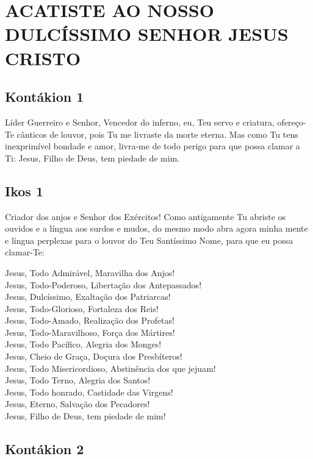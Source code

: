 \documentclass{subfiles}
\begin{document}
\chapter{ACATISTE AO NOSSO DULCÍSSIMO SENHOR JESUS CRISTO}

\section{Kontákion 1}

Líder Guerreiro e Senhor, Vencedor do inferno, eu, Teu servo e
criatura, ofereço-Te cânticos de louvor, pois Tu me livraste da morte eterna.
Mas como Tu tens inexprimível bondade e amor, livra-me de todo perigo para
que possa clamar a Ti: Jesus, Filho de Deus, tem piedade de mim.

\section{Ikos 1}

Criador dos anjos e Senhor dos Exércitos! Como antigamente Tu
abriste os ouvidos e a língua aos surdos e mudos, do mesmo modo abra agora
minha mente e língua perplexas para o louvor do Teu Santíssimo Nome, para
que eu possa clamar-Te:

Jesus, Todo Admirável, Maravilha dos Anjos! \\
Jesus, Todo-Poderoso, Libertação dos Antepassados! \\
Jesus, Dulcíssimo, Exaltação dos Patriarcas! \\
Jesus, Todo-Glorioso, Fortaleza dos Reis! \\
Jesus, Todo-Amado, Realização dos Profetas! \\
Jesus, Todo-Maravilhoso, Força dos Mártires! \\
Jesus, Todo Pacífico, Alegria dos Monges! \\
Jesus, Cheio de Graça, Doçura dos Presbíteros! \\
Jesus, Todo Misericordioso, Abstinência dos que jejuam! \\
Jesus, Todo Terno, Alegria dos Santos! \\
Jesus, Todo honrado, Castidade das Virgens! \\
Jesus, Eterno, Salvação dos Pecadores! \\
Jesus, Filho de Deus, tem piedade de mim!

\section{Kontákion 2}
\end{document}
